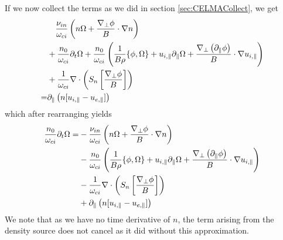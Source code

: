 %
If we now collect the terms as we did in section \ref{sec:CELMACollect}, we get
%
\begin{align*}
  &
  \quad
 \frac{\nu_{in}}{\omega_{ci}} \left(n\Omega + \frac{\nabla_\perp \phi}{B} \cdot \nabla n\right)
  \\
 &
 + \frac{n_0}{\omega_{ci}}\partial_t\Omega
 + \frac{n_0}{\omega_{ci}}
 \left(
 \frac{1}{B\rho}\{\phi, \Omega\}
 + u_{i,\|}\partial_\|\Omega
 + \frac{\nabla_\perp\left( \partial_\|\phi\right)}{B}\cdot\nabla u_{i,\|}
 \right)
 \\
 &
 + \frac{1}{\omega_{ci}}
    \nabla\cdot \left( S_n \left[ \frac{ \nabla_\perp \phi }{ B } \right] \right)
 \\
 =&
 \partial_\| \left(n [u_{i,\|} - u_{e,\|}]\right)
\end{align*}
%
which after rearranging yields
%
\begin{align*}
 \frac{n_0}{\omega_{ci}}\partial_t\Omega
 =&
 - \frac{\nu_{in}}{\omega_{ci}} \left(n\Omega + \frac{\nabla_\perp \phi}{B} \cdot \nabla n\right)
  \\
 &- \frac{n_0}{\omega_{ci}}
 \left( \frac{1}{B\rho}\{\phi, \Omega\}
    + u_{i,\|}\partial_\|\Omega
    + \frac{\nabla_\perp\left( \partial_\|\phi\right)}{B}\cdot\nabla u_{i,\|}
 \right)
 \\
 &
 - \frac{1}{\omega_{ci}}
    \nabla\cdot \left( S_n \left[ \frac{ \nabla_\perp \phi }{ B } \right] \right)
 \\
 &
 + \partial_\| \left(n [u_{i,\|} - u_{e,\|}]\right)
\end{align*}
%
We note that as we have no time derivative of $n$, the term arising from the density source does not cancel as it did without this approximation.
%
